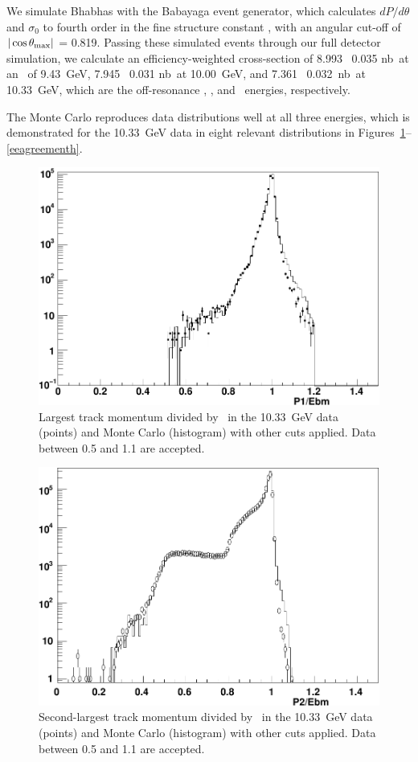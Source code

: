\documentclass{cornell}
\begin{document}
We simulate Bhabhas with the Babayaga event generator, which
calculates $dP/d\theta$ and $\sigma_0$ to fourth order in the fine
structure constant \cite{babayaga}, with an angular cut-off of
$|\cos\theta_{\mbox{\scriptsize max}}|$ = 0.819.  Passing these simulated events
through our full detector simulation, we calculate an
efficiency-weighted cross-section of 8.993 \PM\ 0.035 nb\inv\ at an
\ecm\ of 9.43~GeV, 7.945 \PM\ 0.031 nb\inv\ at 10.00~GeV, and 7.361
\PM\ 0.032~nb\inv\ at 10.33~GeV, which are the off-resonance \us,
\uss, and \usss\ energies, respectively.

The Monte Carlo reproduces data distributions well at all three
energies, which is demonstrated for the 10.33~GeV data in eight
relevant distributions in
Figures~\mbox{\ref{eeagreementa}--\ref{eeagreementh}}.

\begin{figure}[p]
  \begin{center}
    \includegraphics[width=0.7\linewidth]{plots/eeagreementb}
  \end{center}
  \caption[Largest track momentum distribution in Bhabha events]{\label{eeagreementa} Largest track momentum divided by
  \ebeam\ in the 10.33~GeV data (points) and Monte Carlo (histogram)
  with other cuts applied.  Data between 0.5 and 1.1 are accepted.}
\end{figure}

\begin{figure}[p]
  \begin{center}
    \includegraphics[width=0.7\linewidth]{plots/eeagreementc}
  \end{center}
  \caption[Second-largest track momentum distribution in Bhabha events]{\label{eeagreementb} Second-largest track momentum divided
  by \ebeam\ in the 10.33~GeV data (points) and Monte Carlo
  (histogram) with other cuts applied.  Data between 0.5 and 1.1 are
  accepted.}
\end{figure}
\end{document}
